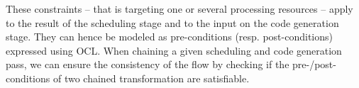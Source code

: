 These constraints -- that is targeting one or several processing resources --
apply to the result of the scheduling stage and to the input on the code
generation stage. They can hence be modeled as pre-conditions (resp.
post-conditions) expressed using OCL. When chaining a given scheduling and
code generation pass, we can ensure the consistency of the flow by checking if
the pre-/post-conditions of two chained transformation are satisfiable.



  